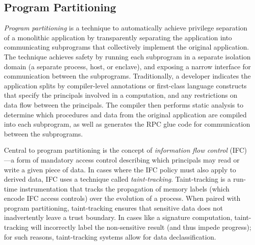 

\subsection{Program Partitioning}



\emph{Program partitioning} is a technique to automatically achieve privilege
separation of a monolithic application by transparently separating the
application into communicating subprograms that collectively implement the
original application.
%
The technique achieves safety by running each subprogram in a separate
isolation domain (a separate process, host, or enclave), and exposing a narrow
interface for communication between the subprograms.
%
Traditionally, a developer indicates the application splits by 
compiler-level annotations or first-class language constructs that specify the
principals involved in a computation, and any restrictions on data flow between
the principals.
%
The compiler then performs static analysis to determine which procedures and
data from the original application are compiled into each subprogram, as well as
generates the RPC glue code for communication between the subprograms.


Central to program partitioning is the concept of \emph{information flow
control} (IFC)---a form of mandatory access control describing which
principals may read or write a given piece of data.
%
In cases where the IFC policy must also apply to derived data, IFC uses a
technique called \emph{taint-tracking}.
%
Taint-tracking is a run-time instrumentation that tracks the
propagation of memory labels (which encode IFC access controls) over the
evolution of a process. 
%
When paired with program partitioning, taint-tracking ensures that sensitive
data does not inadvertently leave a trust boundary.
%
In cases like a signature computation, taint-tracking will incorrectly label
the non-sensitive result (and thus impede progress); for such reasons,
taint-tracking systems allow for data declassification.


